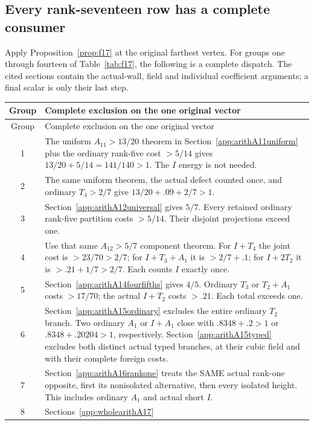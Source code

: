 \subsection{Every rank-seventeen row has a complete consumer}
\label{app:arithrankseventeenclosure}

Apply Proposition~\ref{prop:f17}
at the original farthest vertex.
For groups one through fourteen
of Table~\ref{tab:f17}, the following
is a complete dispatch.
The cited sections contain the
actual-wall, field and individual
coefficient arguments; a final
scalar is only their last step.

\begin{longtable}{cp{10.3cm}}
\toprule Group&Complete exclusion on the one original vector\\\midrule\endfirsthead
\toprule Group&Complete exclusion on the one original vector\\\midrule\endhead
1&The uniform \(A_{11}>13/20\) theorem
in Section~\ref{app:arithA11uniform}
plus the ordinary rank-five cost \(>5/14\)
gives \(13/20+5/14=141/140>1\).
The \(I\) energy is not needed.\\
2&The same uniform theorem, the actual
defect counted once, and ordinary \(T_4>2/7\)
give \(13/20+.09+2/7>1\).\\
3&Section~\ref{app:arithA12universal}
gives \(5/7\). Every retained ordinary
rank-five partition costs \(>5/14\).
Their disjoint projections exceed one.\\
4&Use that same \(A_{12}>5/7\) component
theorem. For \(I+T_4\) the joint cost
is \(>23/70>2/7\); for \(I+T_3+A_1\)
it is \(>2/7+.1\); for \(I+2T_2\)
it is \(>.21+1/7>2/7\).
Each counts \(I\) exactly once.\\
5&Section~\ref{app:arithA14fourfifths}
gives \(4/5\). Ordinary \(T_3\) or
\(T_2+A_1\) costs \(>17/70\);
the actual \(I+T_2\) costs \(>.21\).
Each total exceeds one.\\
6&Section~\ref{app:arithA15ordinary}
excludes the entire ordinary \(T_2\)
branch. Two ordinary \(A_1\) or
\(I+A_1\) close with \(.8348+.2>1\)
or \(.8348+.20204>1\), respectively.
Section~\ref{app:arithA15typed}
excludes both distinct actual typed
branches, at their cubic field and
with their complete foreign costs.\\
7&Section~\ref{app:arithA16rankone}
treats the SAME actual rank-one
opposite, first its nonisolated
alternative, then every isolated
height. This includes ordinary
\(A_1\) and actual short \(I\).\\
8&Sections~\ref{app:wholearithA17}

\end{longtable}
